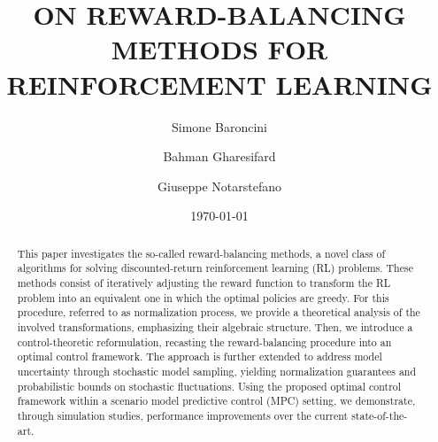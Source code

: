 \documentclass[10pt,leqno]{amsart}
\begin{document}
\title{ON REWARD-BALANCING METHODS FOR REINFORCEMENT LEARNING} %
\setlength{\parindent}{0pt}
\author{Simone Baroncini} %
\address{%
\noindent Department of Electrical, Electronic, and Information Engineering ``Guglielmo Marconi'' - DEI\\
University of Bologna\\
Bologna, Italy}
\author{Bahman Gharesifard} %
\address{Department of Mathematics and Statistics\\
Queen's University\\
Kingston, ON, Canada}
\author{Giuseppe Notarstefano} %
\address{Department of Electrical, Electronic, and Information Engineering ``Guglielmo Marconi'' - DEI\\
University of Bologna\\
Bologna, Italy}

\date{\today}
%
%

%
%

\begin{abstract}
This paper investigates the so-called reward-balancing methods, a novel class of algorithms for solving discounted-return reinforcement learning (RL) problems. These methods consist of iteratively adjusting the reward function to transform the RL problem into an equivalent one in which the optimal policies are greedy. For this procedure, referred to as normalization process, we provide a theoretical analysis of the involved transformations, emphasizing their algebraic structure. Then, we introduce a control-theoretic reformulation, recasting the reward-balancing procedure into an optimal control framework. The approach is further extended to address model uncertainty through stochastic model sampling, yielding normalization guarantees and probabilistic bounds on stochastic fluctuations. Using the proposed optimal control framework within a scenario model predictive control (MPC) setting, we demonstrate, through simulation studies, performance improvements over the current state-of-the-art.
\end{abstract} %
\maketitle

%
\end{document}
